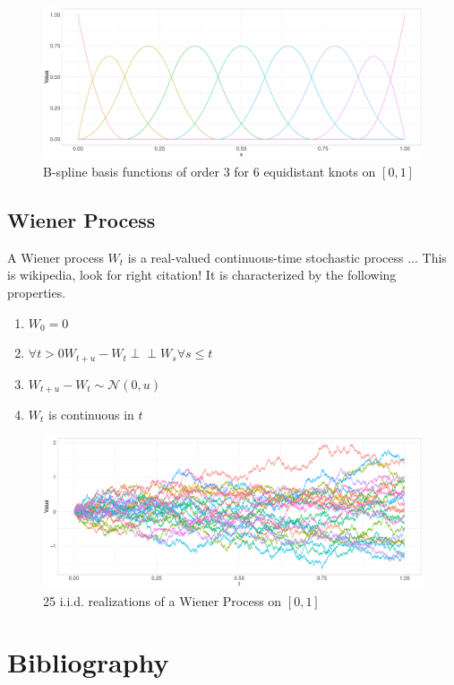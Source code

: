 \documentclass[11pt,twoside,a4paper]{article}
\begin{document}
	\begin{figure}[H]\label{bspline_basis}
		\includegraphics[width = \textwidth]{../Graphics/Bspline_Basis.pdf}
		\caption{B-spline basis functions of order 3 for 6 equidistant knots on $[0,1]$}
	\end{figure}
	
	\subsection{Wiener Process}\label{Wiener}
	A Wiener process $W_t$ is a real-valued continuous-time stochastic process {\color{red} ... This is wikipedia, look for right citation!}
	It is characterized by the following properties.
	
	\begin{multicols}{2}
		\begin{enumerate}
			\item $W_0 = 0$
			\item $\forall t > 0 W_{t+u} - W_t \perp\!\!\!\perp W_s \forall s \leq t$
			\item $W_{t+u} - W_t \sim \mathcal{N}(0,u)$
			\item $W_t$ is continuous in $t$
		\end{enumerate}
	\end{multicols}

	\begin{figure}[H]\label{Wiener_plot}
		\includegraphics[width = \textwidth]{../Graphics/Wiener_plot.pdf}
		\caption{25 i.i.d. realizations of a Wiener Process on $[0,1]$}
	\end{figure}

	\newpage
	
	\section{Bibliography}
	\printbibliography[heading=none]	
	
\end{document}
